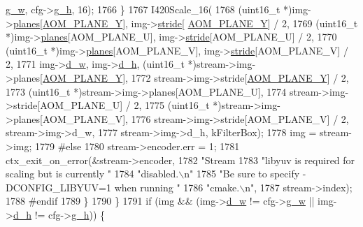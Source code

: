 \begin{DoxyCodeInclude}
{{{{{{{{{{{{{{{{{{{{{{{{{{{{{{{{      \hyperlink{structaom__codec__enc__cfg_a80cb459c5ef3c7e1516f617c4c9d6eab}{g\_w}, cfg->\hyperlink{structaom__codec__enc__cfg_a37b0f57b63bec8d133df8901d4407ee6}{g\_h}, 16);
1766       \}
1767       I420Scale\_16(
1768           (uint16\_t *)img->\hyperlink{structaom__image_ac54dbc5237ca2914f9ec30105dfbe302}{planes}[\hyperlink{aom__image_8h_a2ad22076006b15cf809edcaa33f6d339}{AOM\_PLANE\_Y}], img->\hyperlink{structaom__image_a6dc693d7dbc9eb06c0cdde307ca58372}{stride}[
      \hyperlink{aom__image_8h_a2ad22076006b15cf809edcaa33f6d339}{AOM\_PLANE\_Y}] / 2,
1769           (uint16\_t *)img->\hyperlink{structaom__image_ac54dbc5237ca2914f9ec30105dfbe302}{planes}[AOM\_PLANE\_U], img->\hyperlink{structaom__image_a6dc693d7dbc9eb06c0cdde307ca58372}{stride}[AOM\_PLANE\_U] / 2,
1770           (uint16\_t *)img->\hyperlink{structaom__image_ac54dbc5237ca2914f9ec30105dfbe302}{planes}[AOM\_PLANE\_V], img->\hyperlink{structaom__image_a6dc693d7dbc9eb06c0cdde307ca58372}{stride}[AOM\_PLANE\_V] / 2,
1771           img->\hyperlink{structaom__image_a89f80b1f58d608b9d2080635f4359034}{d\_w}, img->\hyperlink{structaom__image_ab986419a1f0fff93a2dc505f47194988}{d\_h}, (uint16\_t *)stream->img->planes[\hyperlink{aom__image_8h_a2ad22076006b15cf809edcaa33f6d339}{AOM\_PLANE\_Y}],
1772           stream->img->stride[\hyperlink{aom__image_8h_a2ad22076006b15cf809edcaa33f6d339}{AOM\_PLANE\_Y}] / 2,
1773           (uint16\_t *)stream->img->planes[AOM\_PLANE\_U],
1774           stream->img->stride[AOM\_PLANE\_U] / 2,
1775           (uint16\_t *)stream->img->planes[AOM\_PLANE\_V],
1776           stream->img->stride[AOM\_PLANE\_V] / 2, stream->img->d\_w,
1777           stream->img->d\_h, kFilterBox);
1778       img = stream->img;
1779 \textcolor{preprocessor}{#else}
1780       stream->encoder.err = 1;
1781       ctx\_exit\_on\_error(&stream->encoder,
1782                         \textcolor{stringliteral}{"Stream %
1783                         \textcolor{stringliteral}{"libyuv is required for scaling but is currently "}
1784                         \textcolor{stringliteral}{"disabled.\(\backslash\)n"}
1785                         \textcolor{stringliteral}{"Be sure to specify -DCONFIG\_LIBYUV=1 when running "}
1786                         \textcolor{stringliteral}{"cmake.\(\backslash\)n"},
1787                         stream->index);
1788 \textcolor{preprocessor}{#endif}
1789     \}
1790   \}
1791   \textcolor{keywordflow}{if} (img && (img->\hyperlink{structaom__image_a89f80b1f58d608b9d2080635f4359034}{d\_w} != cfg->\hyperlink{structaom__codec__enc__cfg_a80cb459c5ef3c7e1516f617c4c9d6eab}{g\_w} || img->\hyperlink{structaom__image_ab986419a1f0fff93a2dc505f47194988}{d\_h} != cfg->\hyperlink{structaom__codec__enc__cfg_a37b0f57b63bec8d133df8901d4407ee6}{g\_h})) \{
}}}}}}}}}}}}}}}}}}}}}}}}}}}}}}}}}
\end{DoxyCodeInclude}
